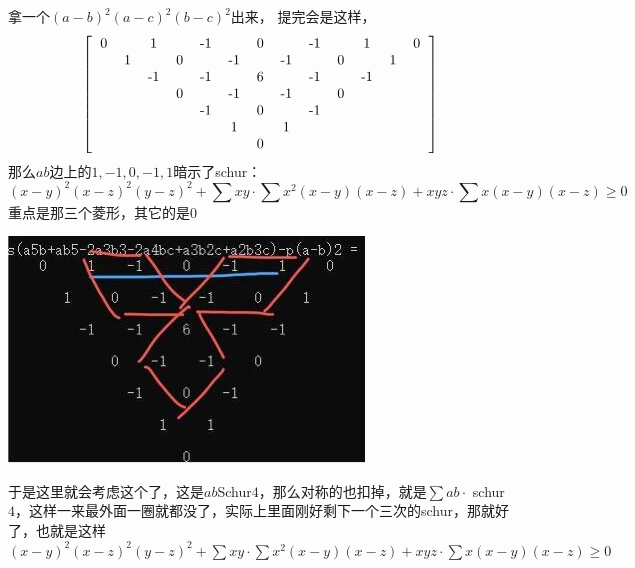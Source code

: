 \documentclass[UTF8]{ctexart}
\begin{document}
拿一个$ (a-b)^{2}(a-c)^{2}(b-c)^{2} $出来，
提完会是这样，
\renewcommand*{\arraystretch}{1.732}\[\left[\begin{matrix}
	\begin{tabular}{ccccccccccccc}
		0&  &1  &  & -1 &  & 0 &  & -1 &  & 1 &  & 0\\
		&1  &  & 0 &  & -1 &  & -1 &  & 0 &  & 1 & \\
		&  & -1 &  & -1 &  &  6&  &  -1&  &  -1&  & \\
		&  &  &  0 &  & -1 &  & -1 &  & 0  &  &  & \\
		&  &  &  &  -1&  &0  &  & -1 &  &  &  & \\
		&  &  &  &  &  1&  &1  &  &  &  &  & \\
		&  &  &  &  &  &  0&  &  &  &  &  & \\
	\end{tabular}
\end{matrix}\right]\]
那么$ ab $边上的$ 1,-1,0,-1,1 $暗示了schur：
$$ (x-y)^{2}(x-z)^{2}(y-z)^{2}+\displaystyle \sum x y \cdot \displaystyle \sum x^{2}(x-y)(x-z)+x y z \cdot \displaystyle \sum x(x-y)(x-z) \geq 0 $$
重点是那三个菱形，其它的是0
\begin{center}
	\includegraphics[width=0.5\linewidth]{170}
\end{center}

于是这里就会考虑这个了，这是$ab$Schur$4 $，那么对称的也扣掉，就是$ \displaystyle \sum ab·$ schur $4 $，这样一来最外面一圈就都没了，实际上里面刚好剩下一个三次的schur，那就好了，也就是这样
$ (x-y)^{2}(x-z)^{2}(y-z)^{2}+\displaystyle \sum x y \cdot \displaystyle \sum x^{2}(x-y)(x-z)+x y z \cdot \displaystyle \sum x(x-y)(x-z) \geq 0 $
\\
\end{document}
